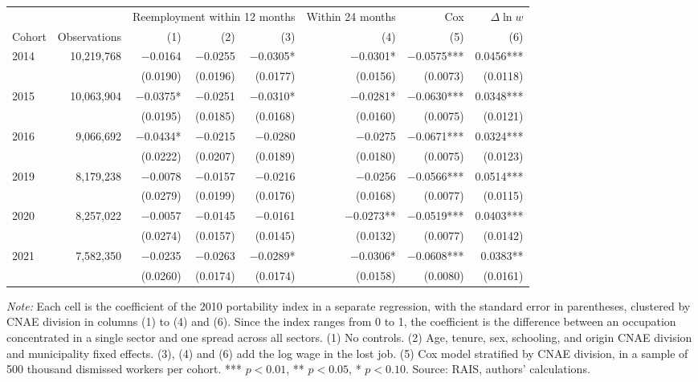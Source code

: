 {\footnotesize
\begin{threeparttable}
\begin{tabular}{lrrrrrrr}
\toprule
 & & \multicolumn{3}{c}{Reemployment within 12 months} & Within 24 months & Cox & $\Delta \ln w$ \\
\cmidrule(lr){3-5}
Cohort & Observations & (1) & (2) & (3) & (4) & (5) & (6) \\
\midrule
2014 & 10,219,768 & $-$0.0164 & $-$0.0255 & $-$0.0305* & $-$0.0301* & $-$0.0575*** & 0.0456*** \\
 &  & (0.0190) & (0.0196) & (0.0177) & (0.0156) & (0.0073) & (0.0118) \\
2015 & 10,063,904 & $-$0.0375* & $-$0.0251 & $-$0.0310* & $-$0.0281* & $-$0.0630*** & 0.0348*** \\
 &  & (0.0195) & (0.0185) & (0.0168) & (0.0160) & (0.0075) & (0.0121) \\
2016 & 9,066,692 & $-$0.0434* & $-$0.0215 & $-$0.0280 & $-$0.0275 & $-$0.0671*** & 0.0324*** \\
 &  & (0.0222) & (0.0207) & (0.0189) & (0.0180) & (0.0075) & (0.0123) \\
2019 & 8,179,238 & $-$0.0078 & $-$0.0157 & $-$0.0216 & $-$0.0256 & $-$0.0566*** & 0.0514*** \\
 &  & (0.0279) & (0.0199) & (0.0176) & (0.0168) & (0.0077) & (0.0115) \\
2020 & 8,257,022 & $-$0.0057 & $-$0.0145 & $-$0.0161 & $-$0.0273** & $-$0.0519*** & 0.0403*** \\
 &  & (0.0274) & (0.0157) & (0.0145) & (0.0132) & (0.0077) & (0.0142) \\
2021 & 7,582,350 & $-$0.0235 & $-$0.0263 & $-$0.0289* & $-$0.0306* & $-$0.0608*** & 0.0383** \\
 &  & (0.0260) & (0.0174) & (0.0174) & (0.0158) & (0.0080) & (0.0161) \\
\bottomrule
\end{tabular}
\begin{tablenotes}[flushleft]\footnotesize
\item \textit{Note:} Each cell is the coefficient of the 2010 portability index in a separate regression, with the standard error in parentheses, clustered by CNAE division in columns (1) to (4) and (6). Since the index ranges from 0 to 1, the coefficient is the difference between an occupation concentrated in a single sector and one spread across all sectors. (1) No controls. (2) Age, tenure, sex, schooling, and origin CNAE division and municipality fixed effects. (3), (4) and (6) add the log wage in the lost job. (5) Cox model stratified by CNAE division, in a sample of 500 thousand dismissed workers per cohort. *** $p<0.01$, ** $p<0.05$, * $p<0.10$. Source: RAIS, authors' calculations.
\end{tablenotes}
\end{threeparttable}
}
